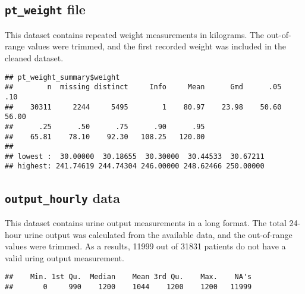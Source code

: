 \documentclass[
]{article}
\newenvironment{Shaded}{\begin{snugshade}}{\end{snugshade}}
\newcommand{\FunctionTok}[1]{\textcolor[rgb]{0.13,0.29,0.53}{\textbf{#1}}}
\newcommand{\NormalTok}[1]{#1}
\newcommand{\SpecialCharTok}[1]{\textcolor[rgb]{0.81,0.36,0.00}{\textbf{#1}}}
\begin{document}
\hypertarget{pt_weight-file}{%
\subsection{\texorpdfstring{\texttt{pt\_weight}
file}{pt\_weight file}}\label{pt_weight-file}}

This dataset contains repeated weight measurements in kilograms. The
out-of-range values were trimmed, and the first recorded weight was
included in the cleaned dataset.

\begin{Shaded}
\end{Shaded}

\begin{verbatim}
## pt_weight_summary$weight 
##        n  missing distinct     Info     Mean      Gmd      .05      .10 
##    30311     2244     5495        1    80.97    23.98    50.60    56.00 
##      .25      .50      .75      .90      .95 
##    65.81    78.10    92.30   108.25   120.00 
## 
## lowest :  30.00000  30.18655  30.30000  30.44533  30.67211
## highest: 241.74619 244.74304 246.00000 248.62466 250.00000
\end{verbatim}

\hypertarget{output_hourly-data}{%
\subsection{\texorpdfstring{\texttt{output\_hourly}
data}{output\_hourly data}}\label{output_hourly-data}}

This dataset contains urine output measurements in a long format. The
total 24-hour urine output was calculated from the available data, and
the out-of-range values were trimmed. As a results, 11999 out of 31831
patients do not have a valid uring output measurement.

\begin{Shaded}
\end{Shaded}

\begin{verbatim}
##    Min. 1st Qu.  Median    Mean 3rd Qu.    Max.    NA's 
##       0     990    1200    1044    1200    1200   11999
\end{verbatim}
\end{document}
